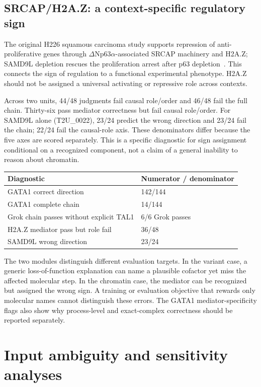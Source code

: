 \subsection{SRCAP/H2A.Z: a context-specific regulatory sign}
The original H226 squamous carcinoma study supports repression of anti-proliferative genes through $\Delta$Np63$\alpha$-associated SRCAP machinery and H2A.Z; SAMD9L depletion rescues the proliferation arrest after p63 depletion~\cite{gallant2012deltanp63alpha}. This connects the sign of regulation to a functional experimental phenotype. H2A.Z should not be assigned a universal activating or repressive role across contexts.

Across two units, 44/48 judgments fail causal role/order and 46/48 fail the full chain. Thirty-six pass mediator correctness but fail causal role/order. For SAMD9L alone (T2U\_0022), 23/24 predict the wrong direction and 23/24 fail the chain; 22/24 fail the causal-role axis. These denominators differ because the five axes are scored separately. This is a specific diagnostic for sign assignment conditional on a recognized component, not a claim of a general inability to reason about chromatin.

\begin{center}
\begin{tabular}{ll}
\toprule
Diagnostic & Numerator / denominator \\
\midrule
GATA1 correct direction & 142/144 \\
GATA1 complete chain & 14/144 \\
Grok chain passes without explicit TAL1 & 6/6 Grok passes \\
H2A.Z mediator pass but role fail & 36/48 \\
SAMD9L wrong direction & 23/24 \\
\bottomrule
\end{tabular}
\end{center}
The two modules distinguish different evaluation targets. In the variant case, a generic loss-of-function explanation can name a plausible cofactor yet miss the affected molecular step. In the chromatin case, the mediator can be recognized but assigned the wrong sign. A training or evaluation objective that rewards only molecular names cannot distinguish these errors. The GATA1 mediator-specificity flags also show why process-level and exact-complex correctness should be reported separately.

\clearpage
\section{Input ambiguity and sensitivity analyses}\label{app:sensitivity}

